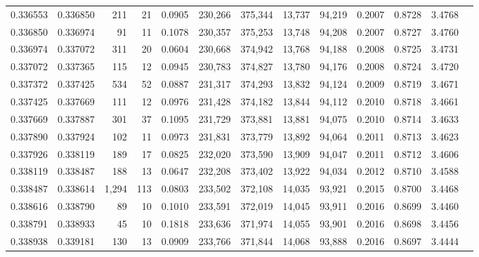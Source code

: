 \begin{tabular}{rrrrrrrrrrrrr}
0.336553 & 0.336850 &   211 &  21 &                                     0.0905 & 230,266 & 375,344 &  13,737 &  94,219 & 0.2007 & 0.8728 & 3.4768 \\
0.336850 & 0.336974 &    91 &  11 &                                     0.1078 & 230,357 & 375,253 &  13,748 &  94,208 & 0.2007 & 0.8727 & 3.4760 \\
0.336974 & 0.337072 &   311 &  20 &                                     0.0604 & 230,668 & 374,942 &  13,768 &  94,188 & 0.2008 & 0.8725 & 3.4731 \\
0.337072 & 0.337365 &   115 &  12 &                                     0.0945 & 230,783 & 374,827 &  13,780 &  94,176 & 0.2008 & 0.8724 & 3.4720 \\
0.337372 & 0.337425 &   534 &  52 &                                     0.0887 & 231,317 & 374,293 &  13,832 &  94,124 & 0.2009 & 0.8719 & 3.4671 \\
0.337425 & 0.337669 &   111 &  12 &                                     0.0976 & 231,428 & 374,182 &  13,844 &  94,112 & 0.2010 & 0.8718 & 3.4661 \\
0.337669 & 0.337887 &   301 &  37 &                                     0.1095 & 231,729 & 373,881 &  13,881 &  94,075 & 0.2010 & 0.8714 & 3.4633 \\
0.337890 & 0.337924 &   102 &  11 &                                     0.0973 & 231,831 & 373,779 &  13,892 &  94,064 & 0.2011 & 0.8713 & 3.4623 \\
0.337926 & 0.338119 &   189 &  17 &                                     0.0825 & 232,020 & 373,590 &  13,909 &  94,047 & 0.2011 & 0.8712 & 3.4606 \\
0.338119 & 0.338487 &   188 &  13 &                                     0.0647 & 232,208 & 373,402 &  13,922 &  94,034 & 0.2012 & 0.8710 & 3.4588 \\
0.338487 & 0.338614 & 1,294 & 113 &                                     0.0803 & 233,502 & 372,108 &  14,035 &  93,921 & 0.2015 & 0.8700 & 3.4468 \\
0.338616 & 0.338790 &    89 &  10 &                                     0.1010 & 233,591 & 372,019 &  14,045 &  93,911 & 0.2016 & 0.8699 & 3.4460 \\
0.338791 & 0.338933 &    45 &  10 &                                     0.1818 & 233,636 & 371,974 &  14,055 &  93,901 & 0.2016 & 0.8698 & 3.4456 \\
0.338938 & 0.339181 &   130 &  13 &                                     0.0909 & 233,766 & 371,844 &  14,068 &  93,888 & 0.2016 & 0.8697 & 3.4444 \\

\end{tabular}
